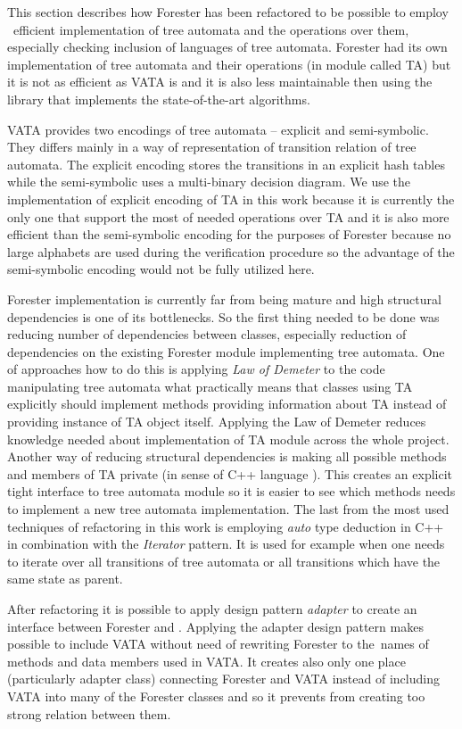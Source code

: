 \documentclass[fleqn,11pt]{ExcelAtFIT} %
\begin{document}
This section describes how Forester has been refactored to be possible to employ \vata\ 
efficient implementation of	tree automata and the operations over them,
especially checking inclusion of languages of tree automata.
Forester had its own implementation of tree automata and their operations (in module called TA)
but it is not as efficient as VATA is and it is also less maintainable
then using the library that implements the state-of-the-art algorithms.

VATA provides two encodings of tree automata -- explicit and semi-symbolic.
They differs mainly in a way of representation of transition relation of tree automata.
The explicit encoding stores the transitions in an explicit hash tables while the semi-symbolic
uses a multi-binary decision diagram.
We use the implementation of explicit encoding of TA in this work because
it is currently the only one that support the most of needed operations over TA and it is also more efficient than
the semi-symbolic encoding for the purposes of Forester because no large alphabets are used during the verification procedure
so the advantage of the semi-symbolic encoding would not be fully utilized here.

Forester implementation is currently far from being mature and
high structural dependencies is one of its bottlenecks.
So the first thing needed to be done was reducing number of dependencies between classes,
especially reduction of dependencies on the existing Forester module implementing tree automata.
One of approaches how to do this is applying \emph{Law of Demeter} \cite{lod89} to the code manipulating tree automata what practically
means that classes using TA explicitly should implement methods providing information about TA instead of providing instance of TA object itself.
Applying the Law of Demeter reduces knowledge needed about implementation of TA module across the whole project.
Another way of reducing structural dependencies is making all possible methods and members of TA private (in sense of C++ language \cite{stroustrup13}).
This creates an explicit tight interface to tree automata module so it is easier to see which methods needs to implement
a new tree automata implementation.
The last from the most used techniques of refactoring in this work is employing \emph{auto} type deduction in C++ in combination
with the \emph{Iterator} pattern.
It is used for example when one needs to iterate over all transitions of tree automata or all transitions which
have the same state as parent.

After refactoring it is possible to apply design pattern \emph{adapter} \cite{gamma95} to create
an interface between Forester and \vata.
Applying the adapter design pattern makes possible to include VATA without need of rewriting
Forester to the~names of methods and data members used in VATA.
It creates also only one place (particularly adapter class) connecting Forester and VATA instead of
including VATA into many of the Forester classes and so it prevents from creating too strong relation between them.
\end{document}
